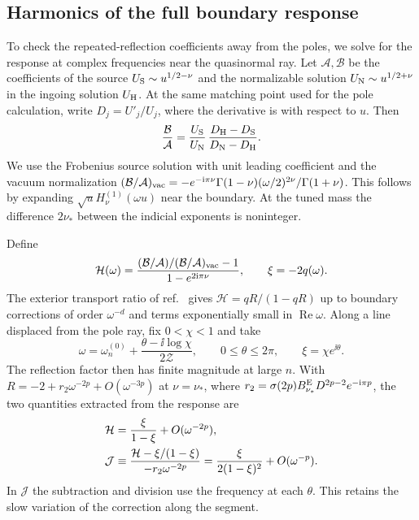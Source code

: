 \subsection{Harmonics of the full boundary response}

To check the repeated-reflection coefficients away from the poles, we
solve for the response at complex frequencies near the quasinormal ray.
Let \(\mathcal A,\mathcal B\) be the coefficients of the source
\(U_{\rm S}\sim u^{1/2-\nu}\) and the normalizable solution
\(U_{\rm N}\sim u^{1/2+\nu}\) in the ingoing solution \(U_{\rm H}\).
At the same matching point used for the pole calculation, write
\(D_j=U'_j/U_j\), where the derivative is with respect to \(u\).
Then
\begin{equation}
 \frac{\mathcal B}{\mathcal A}
 =\frac{U_{\rm S}}{U_{\rm N}}\,
   \frac{D_{\rm H}-D_{\rm S}}{D_{\rm N}-D_{\rm H}} .
 \label{eq:einstein-match-response}
\end{equation}
We use the Frobenius source solution with unit leading coefficient
and the vacuum normalization
\((\mathcal B/\mathcal A)_{\rm vac}=
-e^{-\mathrm{i}\pi\nu}\Gamma(1-\nu)(\omega/2)^{2\nu}/\Gamma(1+\nu)\).
This follows by expanding \(\sqrt{u}H_\nu^{(1)}(\omega u)\) near
the boundary. At the tuned mass the difference \(2\nu_*\) between
the indicial exponents is noninteger.

Define
\begin{equation}
 \mathcal H(\omega)=
 \frac{(\mathcal B/\mathcal A)/(\mathcal B/\mathcal A)_{\rm vac}-1}
      {1-e^{2\mathrm{i}\pi\nu}},\qquad
 \xi=-2q(\omega).
\end{equation}
The exterior transport ratio of ref.~\cite{Jia:2026} gives
\(\mathcal H=qR/(1-qR)\) up to boundary corrections of order
\(\omega^{-d}\) and terms exponentially small in \(\operatorname{Re}\omega\).
Along a line displaced
from the pole ray, fix \(0<\chi<1\) and take
\begin{equation}
 \omega=\omega_n^{(0)}+\frac{\theta-\ii\log\chi}{2\mathcal Z},
 \qquad 0\leq\theta\leq2\pi,\qquad \xi=\chi e^{\ii\theta}.
 \label{eq:einstein-phase-line}
\end{equation}
The reflection factor then has finite magnitude at large \(n\).
With \(R=-2+r_2\omega^{-2p}+O(\omega^{-3p})\) at \(\nu=\nu_*\),
where \(r_2=\sigma(2p)B_{\nu_*}^{\rm E}D^{2p-2}e^{-\mathrm{i}\pi p}\),
the two quantities extracted from the response are
\begin{align}
 \mathcal H&=\frac{\xi}{1-\xi}+O(\omega^{-2p}),\notag\\
 \mathcal J&\equiv
 \frac{\mathcal H-\xi/(1-\xi)}{-r_2\omega^{-2p}}
 =\frac{\xi}{2(1-\xi)^2}+O(\omega^{-p}) .
 \label{eq:einstein-harmonic-test}
\end{align}
In \(\mathcal J\) the subtraction and division use the frequency
at each \(\theta\). This retains the slow variation of the
correction along the segment.

